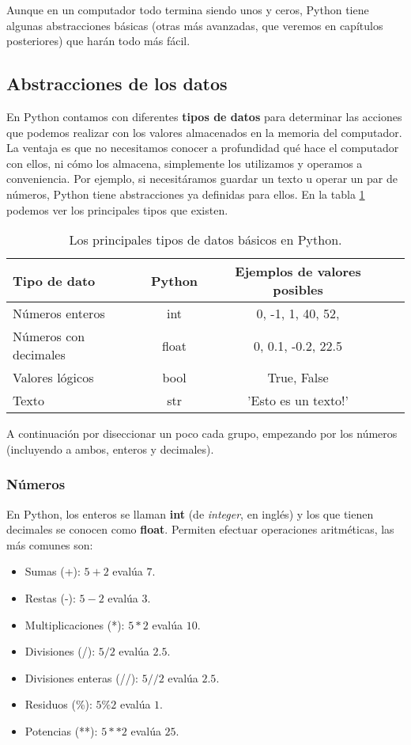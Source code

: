 Aunque en un computador todo termina siendo unos y ceros, Python tiene algunas abstracciones básicas (otras más avanzadas, que veremos en capítulos posteriores) que harán todo más fácil.

\subsection{Abstracciones de los datos}

En Python contamos con diferentes \textbf{tipos de datos} para determinar las acciones que podemos realizar con los valores almacenados en la memoria del computador. La ventaja es que no  necesitamos conocer a profundidad qué hace el computador con ellos, ni cómo los almacena, simplemente los utilizamos y operamos a conveniencia. Por ejemplo, si necesitáramos guardar un texto u operar un par de números, Python tiene abstracciones ya definidas para ellos. En la tabla \ref{tabla_tipos} podemos ver los principales tipos que existen.

\begin{table}[ht]
\centering
\begin{tabular}{ l c c c }
	
	\hline
	Tipo de dato & Python & Ejemplos de valores posibles \\
	\hline
	Números enteros & int  & 0, -1, 1, 40, 52,  \\ 
	Números con decimales & float & 0, 0.1, -0.2, 22.5 \\ 
	Valores lógicos & bool & True, False \\
	Texto & str & 'Esto es un texto!' \\
	\hline
	
\end{tabular}
\caption{Los principales tipos de datos básicos en Python.}
\label{tabla_tipos}
\end{table}

A continuación por diseccionar un poco cada grupo, empezando por los números (incluyendo a ambos, enteros y decimales).

\subsubsection{Números}

En Python, los enteros se llaman \textbf{int} (de \emph{integer}, en inglés) y los que tienen decimales se conocen como \textbf{float}. Permiten efectuar operaciones aritméticas, las más comunes son:

\begin{itemize}
\item Sumas (+): $5 + 2$ evalúa $7$.
\item Restas (-): $5 - 2$ evalúa $3$.
\item Multiplicaciones (*): $5 * 2$ evalúa $10$.
\item Divisiones (/): $5 / 2$ evalúa $2.5$.
\item Divisiones enteras (//): $5 // 2$ evalúa $2.5$.
\item Residuos (\%): $5 \% 2$ evalúa $1$.
\item Potencias (**): $5 ** 2$ evalúa $25$.
\end{itemize}

